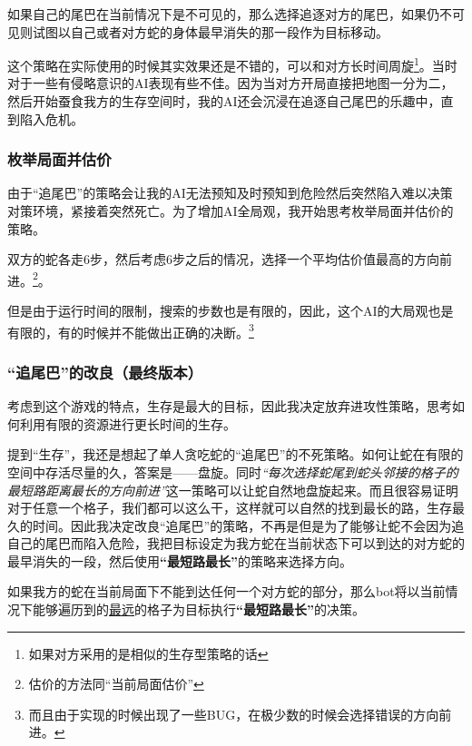 \documentclass[11pt, a4paper]{article}
\begin{document}
				如果自己的尾巴在当前情况下是不可见的，那么选择追逐对方的尾巴，如果仍不可见则试图以自己或者对方蛇的身体最早消失的那一段作为目标移动。
				
				这个策略在实际使用的时候其实效果还是不错的，可以和对方长时间周旋\footnote{如果对方采用的是相似的生存型策略的话}。当时对于一些有侵略意识的AI表现有些不佳。因为当对方开局直接把地图一分为二，然后开始蚕食我方的生存空间时，我的AI还会沉浸在追逐自己尾巴的乐趣中，直到陷入危机。
			\subsubsection{枚举局面并估价}
				由于“追尾巴”的策略会让我的AI无法预知及时预知到危险然后突然陷入难以决策对策环境，紧接着突然死亡。为了增加AI全局观，我开始思考枚举局面并估价的策略。
				
				双方的蛇各走6步，然后考虑6步之后的情况，选择一个平均估价值最高的方向前进。\footnote{估价的方法同“当前局面估价”}。
				
				但是由于运行时间的限制，搜索的步数也是有限的，因此，这个AI的大局观也是有限的，有的时候并不能做出正确的决断。\footnote{而且由于实现的时候出现了一些BUG，在极少数的时候会选择错误的方向前进。}
			
			\subsubsection{“追尾巴”的改良（最终版本）}
				考虑到这个游戏的特点，生存是最大的目标，因此我决定放弃进攻性策略，思考如何利用有限的资源进行更长时间的生存。
				
				提到“生存”，我还是想起了单人贪吃蛇的“追尾巴”的不死策略。如何让蛇在有限的空间中存活尽量的久，答案是——盘旋。同时\emph{“每次选择蛇尾到蛇头邻接的格子的最短路距离最长的方向前进”}这一策略可以让蛇自然地盘旋起来。而且很容易证明对于任意一个格子，我们都可以这么干，这样就可以自然的找到最长的路，生存最久的时间。因此我决定改良“追尾巴”的策略，不再是但是为了能够让蛇不会因为追自己的尾巴而陷入危险，我把目标设定为我方蛇在当前状态下可以到达的对方蛇的最早消失的一段，然后使用\textbf{“最短路最长”}的策略来选择方向。
				
				如果我方的蛇在当前局面下不能到达任何一个对方蛇的部分，那么bot将以当前情况下能够遍历到的\underline{最远}的格子为目标执行\textbf{“最短路最长”}的决策。
\end{document}
